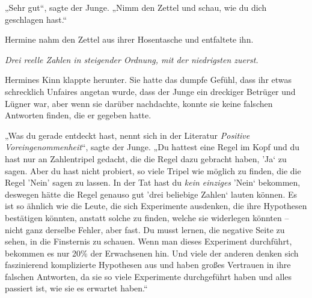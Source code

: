 „Sehr gut“, sagte der Junge. „Nimm den Zettel und schau, wie du dich geschlagen hast.“

Hermine nahm den Zettel aus ihrer Hosentasche und entfaltete ihn.

\emph{Drei reelle Zahlen in steigender Ordnung, mit der niedrigsten zuerst.}

Hermines Kinn klappte herunter. Sie hatte das dumpfe Gefühl, dass ihr etwas schrecklich Unfaires angetan wurde, dass der Junge ein dreckiger Betrüger und Lügner war, aber wenn sie darüber nachdachte, konnte sie keine falschen Antworten finden, die er gegeben hatte.

„Was du gerade entdeckt hast, nennt sich in der Literatur \emph{Positive Voreingenommenheit}“, sagte der Junge. „Du hattest eine Regel im Kopf und du hast nur an Zahlentripel gedacht, die die Regel dazu gebracht haben, ’Ja‘ zu sagen. Aber du hast nicht probiert, so viele Tripel wie möglich zu finden, die die Regel 'Nein' sagen zu lassen. In der Tat hast du \emph{kein einziges} ’Nein‘ bekommen, deswegen hätte die Regel genauso gut ’drei beliebige Zahlen‘ lauten können. Es ist so ähnlich wie die Leute, die sich Experimente ausdenken, die ihre Hypothesen bestätigen könnten, anstatt solche zu finden, welche sie widerlegen könnten – nicht ganz derselbe Fehler, aber fast. Du musst lernen, die negative Seite zu sehen, in die Finsternis zu schauen. Wenn man dieses Experiment durchführt, bekommen es nur 20\% der Erwachsenen hin. Und viele der anderen denken sich faszinierend komplizierte Hypothesen aus und haben großes Vertrauen in ihre falschen Antworten, da sie so viele Experimente durchgeführt haben und alles passiert ist, wie sie es erwartet haben.“

